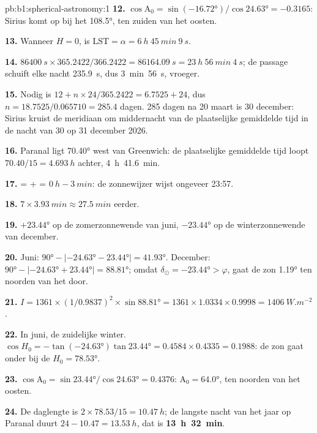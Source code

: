 \begin{solution}{pb:b1:spherical-astronomy:1}
\textbf{12.} $\cos\mathrm{A}_0 = \sin(\ang{-16.72})/\cos\ang{24.63} =
-0.3165$: Sirius komt op bij het  \ang{108.5}, ten zuiden van het oosten.

\textbf{13.} Wanneer $H = 0$, is $\mathrm{LST} = \alpha = \qty{6}{h}~\qty{45}{min}~\qty{9}{s}$.

\textbf{14.} $\qty{86400}{s}\times365.2422/366.2422 = \qty{86164.09}{s} =
\qty{23}{h}~\qty{56}{min}~\qty{4}{s}$; de passage schuift elke nacht
\qty{235.9}{s}, dus \qty{3}{min}~\qty{56}{s}, vroeger.

\textbf{15.} Nodig is $12 + n\times24/365.2422 = 6.7525 + 24$, dus
$n = 18.7525/0.065710 = 285.4$ dagen. 285 dagen na 20 maart is 30 december:
Sirius kruist de meridiaan om middernacht van de plaatselijke gemiddelde tijd in
de nacht van 30 op 31 december 2026.

\textbf{16.} Paranal ligt \ang{70.40} west van Greenwich: de plaatselijke
gemiddelde tijd loopt $70.40/15 = \qty{4.693}{h}$ achter, \qty{4}{h}~\qty{41.6}{min}.

\textbf{17.}  =  +  =
$\qty{0}{h} - \qty{3}{min}$: de zonnewijzer wijst ongeveer 23:57.

\textbf{18.} $7\times\qty{3.93}{min} \approx \qty{27.5}{min}$ eerder.

\textbf{19.} $+\ang{23.44}$ op de zomerzonnewende van juni, $-\ang{23.44}$ op de
winterzonnewende van december.

\textbf{20.} Juni: $\ang{90} - |\ang{-24.63} - \ang{23.44}| = \ang{41.93}$.
December: $\ang{90} - |\ang{-24.63} + \ang{23.44}| = \ang{88.81}$; omdat
$\delta_\odot = \ang{-23.44} > \varphi$, gaat de zon \ang{1.19} ten noorden van
het  door.

\textbf{21.} $I = 1361\times(1/0.9837)^2\times\sin\ang{88.81} = 1361\times
1.0334\times0.9998 = \qty{1406}{W.m^{-2}}$.

\textbf{22.} In juni, de zuidelijke winter. $\cos H_0 = -\tan(\ang{-24.63})
\tan\ang{23.44} = 0.4584\times0.4335 = 0.1988$: de zon gaat onder bij de
 $H_0 = \ang{78.53}$.

\textbf{23.} $\cos\mathrm{A}_0 = \sin\ang{23.44}/\cos\ang{24.63} = 0.4376$:
$\mathrm{A}_0 = \ang{64.0}$, ten noorden van het oosten.

\textbf{24.} De daglengte is $2\times78.53/15 = \qty{10.47}{h}$; de langste nacht
van het jaar op Paranal duurt $24 - 10.47 = \qty{13.53}{h}$, dat is
\textbf{\qty[text-series-to-math=true]{13}{h}~\qty[text-series-to-math=true]{32}{min}}.
\end{solution}
